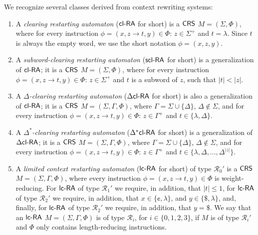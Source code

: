 \begin{definition}\label{definition:derived-classes}
We recognize several classes derived from context rewriting systems:
\begin{enumerate}
\item\label{definition:clra} A \emph{clearing restarting automaton} \citep{CM10} (\index{$\clRA$}\emph{$\clRA$} for short) is a $\textup{\sf CRS\/}$ $M = (\Sigma, \Phi)$, where for every instruction $\phi = (x, z \to t, y) \in \Phi$: $z \in \Sigma^+$ and $t = \lambda$. Since $t$ is always the empty word, we use the short notation $\phi = (x, z, y)$.

\item\label{definition:sclra}
A \emph{subword-clearing restarting automaton} \citep{C12} (\index{$\sclRA$}\emph{$\sclRA$} for short) is a generalization of $\clRA$; it is a $\textup{\sf CRS\/}$ $M = (\Sigma, \Phi)$, where for every instruction $\phi = (x, z \to t, y) \in \Phi$: $z \in \Sigma^+$ and $t$ is a subword of $z$, such that $|t| < |z|$.

\item\label{definition:dclra} A \emph{$\Delta$-clearing restarting automaton} \citep{CM10} (\index{$\DclRA$}\emph{$\DclRA$} for short) is also a generalization of $\clRA$; it is a $\textup{\sf CRS\/}$ $M = (\Sigma, \Gamma, \Phi)$, where $\Gamma = \Sigma \cup \{\Delta\}$, $\Delta \notin \Sigma$, and for every instruction $\phi = (x, z \to t, y) \in \Phi$: $z \in \Gamma^+$ and $t \in \{\lambda, \Delta\}$.

\item\label{definition:dxclra} A \emph{$\Delta^*$-clearing restarting automaton} \citep{CM10} (\index{$\DXclRA$}\emph{$\DXclRA$} for short) is a generalization of $\DclRA$; it is a $\textup{\sf CRS\/}$ $M = (\Sigma, \Gamma, \Phi)$, where $\Gamma = \Sigma \cup \{\Delta\}$, $\Delta \notin \Sigma$, and for every instruction $\phi = (x, z \to t, y) \in \Phi$: $z \in \Gamma^+$ and $t \in \{\lambda, \Delta, \ldots, \Delta^{|z|}\}$.

\item \label{definition:lcra} A \emph{limited context restarting automaton} \citep{B10Diploma, B11, OCM13} (\index{$\lcRA$}\emph{$\lcRA$} for short) of type $\mathcal{R}_0'$ is a $\textup{\sf CRS\/}$ $M = (\Sigma, \Gamma, \Phi)$, where every instruction $\phi = (x, z \to t, y) \in \Phi$ is weight-reducing. For $\lcRA$ of type $\mathcal{R}_1'$ we require, in addition, that $|t| \le 1$, for $\lcRA$ of type $\mathcal{R}_2'$ we require, in addition, that $x \in \{\cent, \lambda\}$, and $y \in \{\$, \lambda\}$, and, finally, for $\lcRA$ of type $\mathcal{R}_2'$ we require, in addition, that $y = \$$. We say that an $\lcRA$ $M=(\Sigma,\Gamma,\Phi)$ is of type $\mathcal{R}_i$, for $i \in \{0, 1, 2, 3\}$, if $M$ is of type $\mathcal{R}_i'$ and $\Phi$ only contains length-reducing instructions.
\end{enumerate}
\end{definition}

